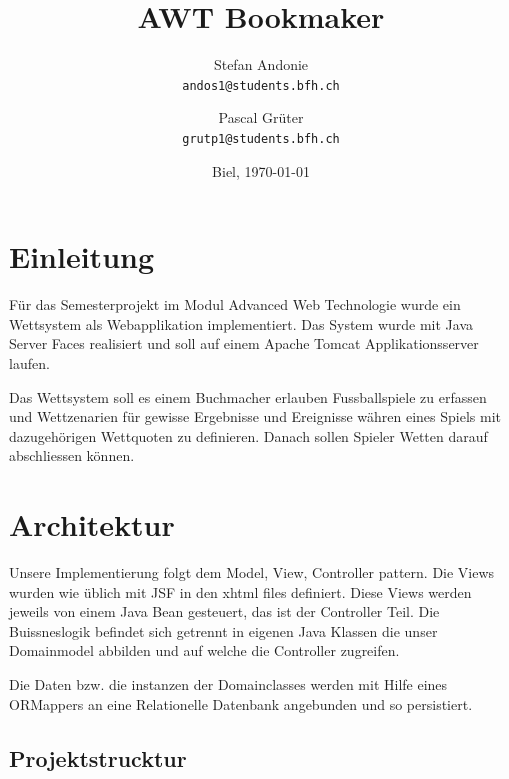 \documentclass[a4paper, abstracton]{scrartcl}
\begin{document}
\title{\vspace{1cm}AWT Bookmaker \vspace{1cm}}
\author{
  Stefan Andonie\\
  \texttt{andos1@students.bfh.ch}
  \and
  Pascal Grüter\\
  \texttt{grutp1@students.bfh.ch}\vspace{1cm}
}

\date{Biel, \today}
\vspace{3cm}
\maketitle
\thispagestyle{titlepage}


\pagebreak

\section{Einleitung}

  Für das Semesterprojekt im Modul Advanced Web Technologie wurde ein Wettsystem
  als Webapplikation implementiert.
  Das System wurde mit Java Server Faces realisiert und soll auf einem Apache
  Tomcat Applikationsserver laufen.
  
  Das Wettsystem soll es einem Buchmacher erlauben Fussballspiele zu erfassen
  und Wettzenarien für gewisse Ergebnisse und Ereignisse währen eines Spiels mit
  dazugehörigen Wettquoten zu definieren.
  Danach sollen Spieler Wetten darauf abschliessen können.

\section{Architektur}

  Unsere Implementierung folgt dem Model, View, Controller pattern.
  Die Views wurden wie üblich mit JSF in den xhtml files definiert.
  Diese Views werden jeweils von einem Java Bean gesteuert, das ist der
  Controller Teil. Die Buissneslogik befindet sich getrennt in eigenen Java
  Klassen die unser Domainmodel abbilden und auf welche die Controller zugreifen.
  
  Die Daten bzw. die instanzen der Domainclasses werden mit Hilfe eines ORMappers
  an eine Relationelle Datenbank angebunden und so persistiert.

  \subsection{Projektstrucktur}
\end{document}
